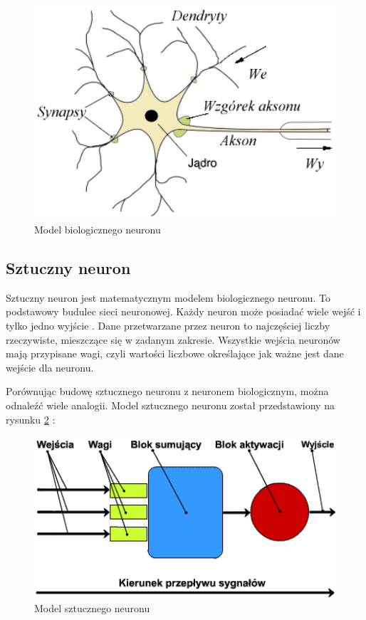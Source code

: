 \vspace{0.3cm}
\begin{figure}[H]
\centering
\includegraphics[width=15cm]{resources/figures/natural_neuron_model.png}
\caption{Model biologicznego neuronu}
\label{NaturalNeuronModel}
\end{figure}

\subsection{Sztuczny neuron}
Sztuczny neuron jest matematycznym modelem biologicznego neuronu. To podstawowy budulec sieci neuronowej. Każdy neuron może posiadać wiele wejść i tylko jedno wyjście \cite{neuralNetworks:introduction}. Dane przetwarzane przez neuron to najczęściej liczby rzeczywiste, mieszczące się w zadanym zakresie. Wszystkie wejścia neuronów mają przypisane wagi, czyli wartości liczbowe określające jak ważne jest dane wejście dla neuronu.

Porównując budowę sztucznego neuronu z neuronem biologicznym, można odnaleźć wiele analogii. Model sztucznego neuronu został przedstawiony na rysunku \ref{ArtificialNeuronModel} \cite{klaus:neuronOverview}:
\vspace{0.3cm}
\begin{figure}[H]
\centering
\includegraphics[width=15cm]{resources/figures/artificial_neuron.png}
\caption{Model sztucznego neuronu}
\label{ArtificialNeuronModel}
\end{figure}

